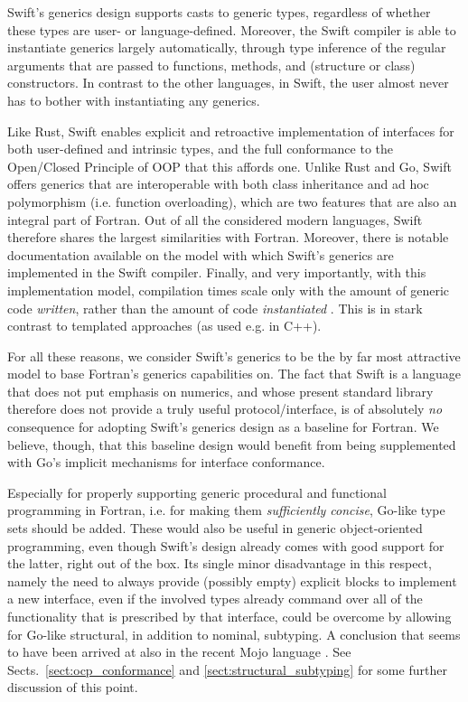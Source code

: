 \documentclass[11pt,oneside]{report}
\newcommand{\code}[1]{{\selectfont\ttfamily{#1}}}
\begin{document}
Swift's generics design supports casts to generic types, regardless of
whether these types are user- or language-defined. Moreover, the Swift
compiler is able to instantiate generics largely automatically,
through type inference of the regular arguments that are passed to
functions, methods, and (structure or class) constructors. In contrast
to the other languages, in Swift, the user almost never has to bother
with instantiating any generics.

Like Rust, Swift enables explicit and retroactive implementation of
interfaces for both user-defined and intrinsic types, and the full
conformance to the Open/Closed Principle of OOP that this affords
one. Unlike Rust and Go, Swift offers generics that are interoperable
with both class inheritance and ad hoc polymorphism (i.e. function
overloading), which are two features that are also an integral part of
Fortran. Out of all the considered modern languages, Swift therefore
shares the largest similarities with Fortran. Moreover, there is
notable documentation available
\cite{Swift_Generics,Swift_Generics_Book} on the model with which
Swift's generics are implemented in the Swift compiler. Finally, and
very importantly, with this implementation model, compilation times
scale only with the amount of generic code \emph{written}, rather than
the amount of code \emph{instantiated} \cite{Swift_Generics}. This is
in stark contrast to templated approaches (as used e.g. in C++).

For all these reasons, we consider Swift's generics to be the by far
most attractive model to base Fortran's generics capabilities
on. The fact that Swift is a language that does not put emphasis on
numerics, and whose present standard library therefore does not
provide a truly useful \code{Numeric} protocol/interface, is of
absolutely \emph{no} consequence for adopting Swift's generics design
as a baseline for Fortran. We believe, though, that this baseline
design would benefit from being supplemented with Go's
implicit mechanisms for interface conformance.

Especially for properly supporting generic procedural and functional
programming in Fortran, i.e. for making them \emph{sufficiently
concise}, Go-like type sets should be added. These would also be
useful in generic object-oriented programming, even though Swift's
design already comes with good support for the latter, right out of
the box. Its single minor disadvantage in this respect, namely the
need to always provide (possibly empty) explicit \code{extension}
blocks to implement a new interface, even if the involved types already
command over all of the functionality that is prescribed by that
interface, could be overcome by allowing for Go-like structural, in
addition to nominal, subtyping. A conclusion that seems to have been
arrived at also in the recent Mojo language \cite{MojoRef}. See
Sects.~\ref{sect:ocp_conformance} and \ref{sect:structural_subtyping}
for some further discussion of this point.
\end{document}

